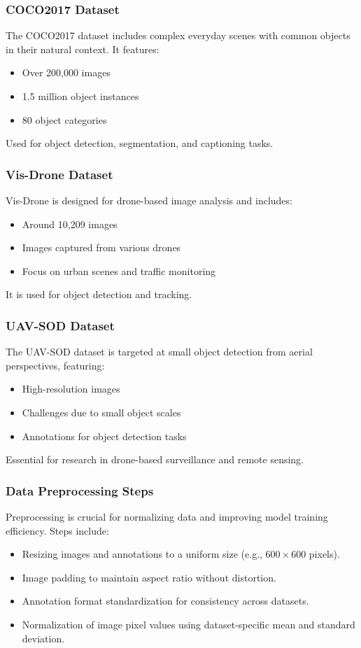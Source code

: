 \documentclass{beamer}
\begin{document}
\begin{frame}[t]
  \frametitle{COCO2017 Dataset}
  The COCO2017 dataset includes complex everyday scenes with common objects in their natural context. It features:
  \begin{itemize}
    \item Over 200,000 images
    \item 1.5 million object instances
    \item 80 object categories
  \end{itemize}
  Used for object detection, segmentation, and captioning tasks.
\end{frame}

\begin{frame}[t]
  \frametitle{Vis-Drone Dataset}
  Vis-Drone is designed for drone-based image analysis and includes:
  \begin{itemize}
    \item Around 10,209 images
    \item Images captured from various drones
    \item Focus on urban scenes and traffic monitoring
  \end{itemize}
  It is used for object detection and tracking.
\end{frame}

\begin{frame}[t]
  \frametitle{UAV-SOD Dataset}
  The UAV-SOD dataset is targeted at small object detection from aerial perspectives, featuring:
  \begin{itemize}
    \item High-resolution images
    \item Challenges due to small object scales
    \item Annotations for object detection tasks
  \end{itemize}
  Essential for research in drone-based surveillance and remote sensing.
\end{frame}

\begin{frame}[t]
  \frametitle{Data Preprocessing Steps}
  Preprocessing is crucial for normalizing data and improving model training efficiency. Steps include:
  \begin{itemize}
    \item Resizing images and annotations to a uniform size (e.g., \(600 \times 600\) pixels).
    \item Image padding to maintain aspect ratio without distortion.
    \item Annotation format standardization for consistency across datasets.
    \item Normalization of image pixel values using dataset-specific mean and standard deviation.
  \end{itemize}
\end{frame}
\end{document}
